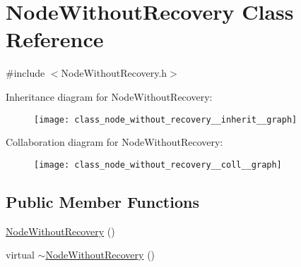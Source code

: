 \hypertarget{class_node_without_recovery}{}\section{Node\+Without\+Recovery Class Reference}
\label{class_node_without_recovery}


{\ttfamily \#include $<$Node\+Without\+Recovery.\+h$>$}



Inheritance diagram for Node\+Without\+Recovery\+:\nopagebreak
\begin{figure}[H]
\begin{center}
\leavevmode
\texttt{[image: class\_node\_without\_recovery\_\_inherit\_\_graph]}
\end{center}
\end{figure}


Collaboration diagram for Node\+Without\+Recovery\+:\nopagebreak
\begin{figure}[H]
\begin{center}
\leavevmode
\texttt{[image: class\_node\_without\_recovery\_\_coll\_\_graph]}
\end{center}
\end{figure}
\subsection*{Public Member Functions}
\begin{DoxyCompactItemize}
\item 
\hyperlink{class_node_without_recovery_a81c3fab3d91ae3bd6496b876d16694d8}{Node\+Without\+Recovery} ()
\item 
virtual \hyperlink{class_node_without_recovery_a2690cfda5b6d9998ee873babb3418870}{$\sim$\+Node\+Without\+Recovery} ()
\end{DoxyCompactItemize}
